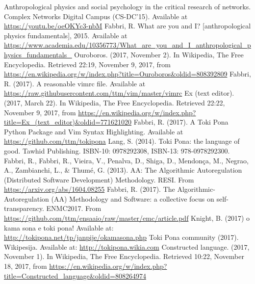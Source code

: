 \documentclass{article}
\begin{document}
\begin{thebibliography}{99}
\fontsize{11}{0}\selectfont
{}
	Anthropological physics and social psychology in the critical research of networks. Complex Networks Digital Campus (CS-DC'15).
	Available at \url{https://youtu.be/oeOKYc3-nbM}
	Fabbri, R. What are you and I? [anthropological physics fundamentals], 2015. Available at \url{https://www.academia.edu/10356773/What_are_you_and_I_anthropological_physics_fundamentals_}
  Ouroboros. (2017, November 2). In Wikipedia, The Free Encyclopedia. Retrieved 22:19, November 9, 2017, from \url{https://en.wikipedia.org/w/index.php?title=Ouroboros&oldid=808392809}
	Fabbri, R. (2017). A reasonable vimrc file. Available at \url{https://raw.githubusercontent.com/ttm/vim/master/vimrc} 
  Ex (text editor). (2017, March 22). In Wikipedia, The Free Encyclopedia. Retrieved 22:22, November 9, 2017, from \url{https://en.wikipedia.org/w/index.php?title=Ex_(text_editor)&oldid=771621020}
	Fabbri, R. (2017). A Toki Pona Python Package and Vim Syntax Highlighting. Available at \url{https://github.com/ttm/tokipona} 
	Lang, S. (2014). Toki Pona: the language of good. Tawhid Publishing.
    ISBN-10: 0978292308, ISBN-13: 978-0978292300.
	Fabbri, R., Fabbri, R., Vieira, V., Penalva, D., Shiga, D., Mendonça, M., Negrao, A., Zambianchi, L., \& Thumé, G. (2013). AA: The Algorithmic Autoregulation (Distributed Software Development) Methodology. RESI. From \url{https://arxiv.org/abs/1604.08255}
	Fabbri, R. (2017).
The Algorithmic-Autoregulation (AA) Methodology and Software:
a collective focus on self-transparency. ENMC2017. From \url{https://github.com/ttm/ensaaio/raw/master/emc/article.pdf} 
  Knight, B. (2017) o kama sona e toki pona! Available at:
    \url{http://tokipona.net/tp/janpije/okamasona.php}
  Toki Pona community (2017). Wikipesija. Available at:
    \url{http://tokipona.wikia.com}
  Constructed language. (2017, November 1). In Wikipedia, The Free Encyclopedia. Retrieved 10:22, November 18, 2017, from \url{https://en.wikipedia.org/w/index.php?title=Constructed_language&oldid=808264974}
\end{thebibliography}
\end{document}

